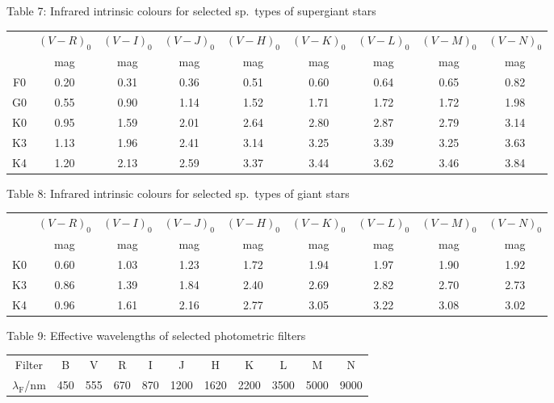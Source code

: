 \medskip
\noindent Table 7: Infrared intrinsic colours for selected sp.\ types of
supergiant stars

\begin{center}
\begin{tabular}{ccccccccc}
\hline
 & $(V-R)_0$ & $(V-I)_0$ & $(V-J)_0$ & $(V-H)_0$ & $(V-K)_0$ & $(V-L)_0$ &
   $(V-M)_0$ & $(V-N)_0$ \\
 & mag & mag & mag & mag & mag & mag & mag & mag \\
\hline
F0 & 0.20 & 0.31 & 0.36 & 0.51 & 0.60 & 0.64 & 0.65 & 0.82 \\
G0 & 0.55 & 0.90 & 1.14 & 1.52 & 1.71 & 1.72 & 1.72 & 1.98 \\
K0 & 0.95 & 1.59 & 2.01 & 2.64 & 2.80 & 2.87 & 2.79 & 3.14 \\
K3 & 1.13 & 1.96 & 2.41 & 3.14 & 3.25 & 3.39 & 3.25 & 3.63 \\
K4 & 1.20 & 2.13 & 2.59 & 3.37 & 3.44 & 3.62 & 3.46 & 3.84 \\
\hline
\end{tabular}
\end{center}

\medskip
\noindent Table 8: Infrared intrinsic colours for selected sp.\ types of
giant stars

\begin{center}
\begin{tabular}{ccccccccc}
\hline
 & $(V-R)_0$ & $(V-I)_0$ & $(V-J)_0$ & $(V-H)_0$ & $(V-K)_0$ & $(V-L)_0$ &
   $(V-M)_0$ & $(V-N)_0$ \\
 & mag & mag & mag & mag & mag & mag & mag & mag \\
\hline
K0 & 0.60 & 1.03 & 1.23 & 1.72 & 1.94 & 1.97 & 1.90 & 1.92 \\
K3 & 0.86 & 1.39 & 1.84 & 2.40 & 2.69 & 2.82 & 2.70 & 2.73 \\
K4 & 0.96 & 1.61 & 2.16 & 2.77 & 3.05 & 3.22 & 3.08 & 3.02 \\
\hline
\end{tabular}
\end{center}

\medskip
\noindent Table 9: Effective wavelengths of selected photometric filters

\begin{center}
\begin{tabular}{ccccccccccc}
\hline
Filter & B & V & R & I & J & H & K & L & M & N \\
$\lambda_{\mathrm{F}}$/nm & 450 & 555 & 670 & 870 & 1200 & 1620 & 2200 &
  3500 & 5000 & 9000 \\
\hline
\end{tabular}
\end{center}

